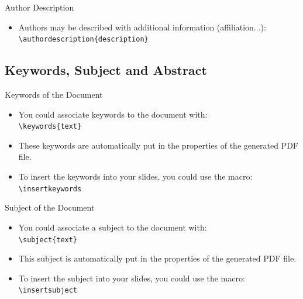 \documentclass[english,sectioncirclenumberstyle]{ciadbeamer}
\begin{document}
\begin{frame}{Author Description}
	\begin{itemize}
	\item Authors may be described with additional information (affiliation...): \\
		\texttt{{\textbackslash}authordescription\{description\}}
	\end{itemize}
	\vfill
\end{frame}

\subsection{Keywords, Subject and Abstract}

\begin{frame}{Keywords of the Document}
	\begin{itemize}
	\item You could associate keywords to the document with: \\
		\texttt{{\textbackslash}keywords\{text\}}
	\vspace{1em}
	\item These keywords are automatically put in the properties of the generated PDF file.
	\vspace{1em}
	\item To insert the keywords into your slides, you could use the macro: \\
			\texttt{{\textbackslash}insertkeywords}
	\end{itemize}
	\begin{example}
		\insertkeywords
	\end{example}
\end{frame}

\begin{frame}{Subject of the Document}
	\begin{itemize}
	\item You could associate a subject to the document with: \\
		\texttt{{\textbackslash}subject\{text\}}
	\vspace{1em}
	\item This subject is automatically put in the properties of the generated PDF file.
	\vspace{1em}
	\item To insert the subject into your slides, you could use the macro: \\
			\texttt{{\textbackslash}insertsubject}
	\end{itemize}
	\begin{example}
		\insertsubject
	\end{example}
\end{frame}
\end{document}
